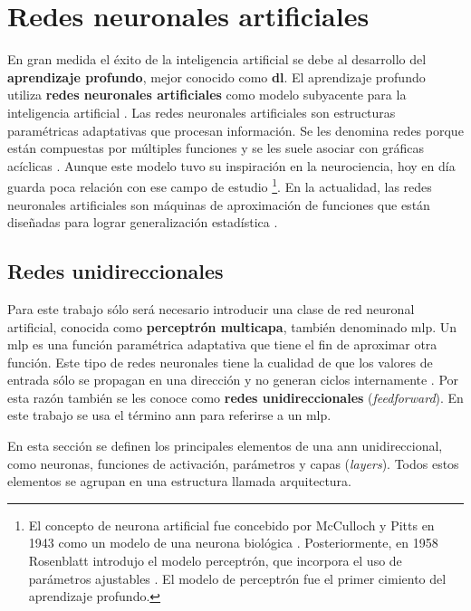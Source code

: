 \chapter{Redes neuronales artificiales}
\label{appendix:DL}

En gran medida el éxito de la inteligencia artificial se debe al desarrollo del \textbf{aprendizaje profundo}, mejor conocido como \textbf{\acrfull{dl}}. El aprendizaje profundo utiliza \textbf{redes neuronales artificiales} como modelo subyacente para la inteligencia artificial \cite{Roberts_2022}. Las redes neuronales artificiales son estructuras paramétricas adaptativas que procesan información. Se les denomina redes porque están compuestas por múltiples funciones y se les suele asociar con gráficas acíclicas \cite{Goodfellow-et-al-2016}. Aunque este modelo tuvo su inspiración en la neurociencia, hoy en día guarda poca relación con ese campo de estudio \footnote{El concepto de neurona artificial fue concebido por McCulloch y Pitts en 1943 como un modelo de una neurona biológica \cite{Roberts_2022}. Posteriormente, en 1958 Rosenblatt introdujo el modelo perceptrón, que incorpora el uso de parámetros ajustables \cite{Roberts_2022}. El modelo de perceptrón fue el primer cimiento del aprendizaje profundo.}. En la actualidad, las redes neuronales artificiales son máquinas de aproximación de funciones que están diseñadas para lograr generalización estadística \cite{Goodfellow-et-al-2016}. 

\section{Redes unidireccionales}
Para este trabajo sólo será necesario introducir una clase de red neuronal artificial, conocida como \textbf{perceptrón multicapa}, también denominado \acrfull{mlp}. Un \acrshort{mlp} es una función paramétrica adaptativa que tiene el fin de aproximar otra función. Este tipo de redes neuronales tiene la cualidad de que los valores de entrada sólo se propagan en una dirección y no generan ciclos internamente \cite{Roberts_2022}. Por esta razón también se les conoce como \textbf{redes unidireccionales} (\textit{feedforward}). En este trabajo se usa el término \acrfull{ann} para referirse a un \acrshort{mlp}.

En esta sección se definen los principales elementos de una \acrshort{ann} unidireccional, como  neuronas, funciones de activación, parámetros y capas (\textit{layers}). Todos estos elementos se agrupan en una estructura llamada arquitectura.


